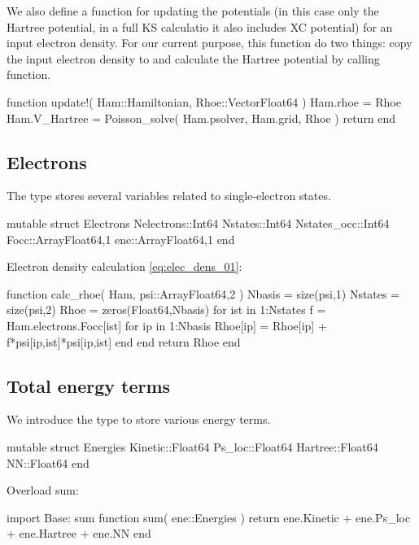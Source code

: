 We also define a function for updating the potentials (in this case only the Hartree potential, in
a full KS calculatio it also includes XC potential)
for an input electron density.
For our current purpose, this function do two things:
copy the input electron density to  and calculate the
Hartree potential by calling  function.

\begin{juliacode}
function update!( Ham::Hamiltonian, Rhoe::Vector{Float64} )
  Ham.rhoe = Rhoe
  Ham.V_Hartree = Poisson_solve( Ham.psolver, Ham.grid, Rhoe )
  return
end
\end{juliacode}


\subsection{Electrons}

The type  stores several variables related to single-electron states.
\begin{juliacode}
mutable struct Electrons
  Nelectrons::Int64
  Nstates::Int64
  Nstates_occ::Int64
  Focc::Array{Float64,1}
  ene::Array{Float64,1}
end
\end{juliacode}

Electron density calculation \ref{eq:elec_dens_01}:

\begin{juliacode}
function calc_rhoe( Ham, psi::Array{Float64,2} )
  Nbasis = size(psi,1)
  Nstates = size(psi,2)
  Rhoe = zeros(Float64,Nbasis)
  for ist in 1:Nstates
    f = Ham.electrons.Focc[ist]
    for ip in 1:Nbasis
      Rhoe[ip] = Rhoe[ip] + f*psi[ip,ist]*psi[ip,ist]
    end
  end
  return Rhoe
end
\end{juliacode}


\subsection{Total energy terms}

We introduce the  type to store various energy terms.
\begin{juliacode}
mutable struct Energies
  Kinetic::Float64
  Ps_loc::Float64
  Hartree::Float64
  NN::Float64
end
\end{juliacode}

Overload sum:
\begin{juliacode}
import Base: sum
function sum( ene::Energies )
  return ene.Kinetic + ene.Ps_loc + ene.Hartree + ene.NN
end
\end{juliacode}

